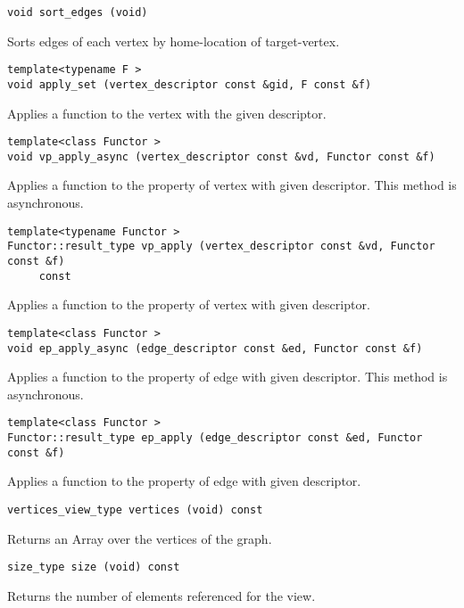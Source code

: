 \begin{verbatim}
void sort_edges (void)
\end{verbatim}

Sorts edges of each vertex by home-location of target-vertex.

\begin{verbatim}
template<typename F >
void apply_set (vertex_descriptor const &gid, F const &f)
\end{verbatim}

Applies a function to the vertex with the given descriptor.

\begin{verbatim}
template<class Functor >
void vp_apply_async (vertex_descriptor const &vd, Functor const &f)
\end{verbatim}

Applies a function to the property of vertex with given descriptor. This method is asynchronous.

\begin{verbatim}
template<typename Functor >
Functor::result_type vp_apply (vertex_descriptor const &vd, Functor const &f)
     const
\end{verbatim}

Applies a function to the property of vertex with given descriptor.

\begin{verbatim}
template<class Functor >
void ep_apply_async (edge_descriptor const &ed, Functor const &f)
\end{verbatim}

Applies a function to the property of edge with given descriptor. This method is asynchronous.

\begin{verbatim}
template<class Functor >
Functor::result_type ep_apply (edge_descriptor const &ed, Functor const &f)
\end{verbatim}

Applies a function to the property of edge with given descriptor.

\begin{verbatim}
vertices_view_type vertices (void) const
\end{verbatim}

Returns an Array over the vertices of the graph.

\begin{verbatim}
size_type size (void) const
\end{verbatim}

Returns the number of elements referenced for the view.

